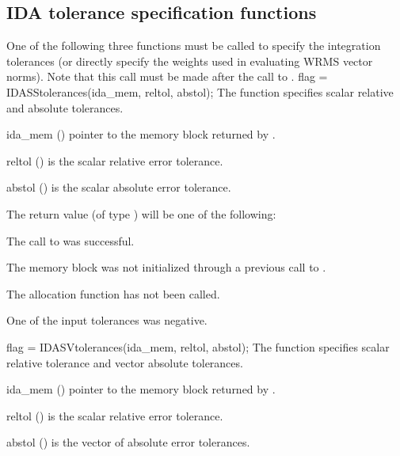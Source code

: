 \subsection{IDA tolerance specification functions}\label{sss:idatolerances}
One of the following three functions must be called to specify the
integration tolerances (or directly specify the weights used in
evaluating WRMS vector norms).  Note that this call must be made after
the call to .
{
  flag = IDASStolerances(ida\_mem, reltol, abstol);
}
{
  The function  specifies scalar relative and absolute
  tolerances.
}
{
  \begin{args}
  \item[ida\_mem] ()
    pointer to the {\ida} memory block returned by .
  \item[reltol] ()
    is the scalar relative error tolerance.
  \item[abstol] ()
    is the scalar absolute error tolerance.
  \end{args}
}
{
  The return value  (of type ) will be one of the following:
  \begin{args}
  \item[\Id{IDA\_SUCCESS}]
    The call to  was successful.
  \item[\Id{IDA\_MEM\_NULL}] 
    The {\ida} memory block was not initialized through a previous call to
    .
  \item[\Id{IDA\_NO\_MALLOC}] 
    The allocation function  has not been called.
  \item[\Id{IDA\_ILL\_INPUT}] 
    One of the input tolerances was negative.
  \end{args}
}
{}
{
  flag = IDASVtolerances(ida\_mem, reltol, abstol);
}
{
  The function  specifies scalar relative tolerance and
  vector absolute tolerances.
}
{
  \begin{args}
  \item[ida\_mem] ()
    pointer to the {\ida} memory block returned by .
  \item[reltol] ()
    is the scalar relative error tolerance.
  \item[abstol] ()
    is the vector of absolute error tolerances.
  \end{args}
}
